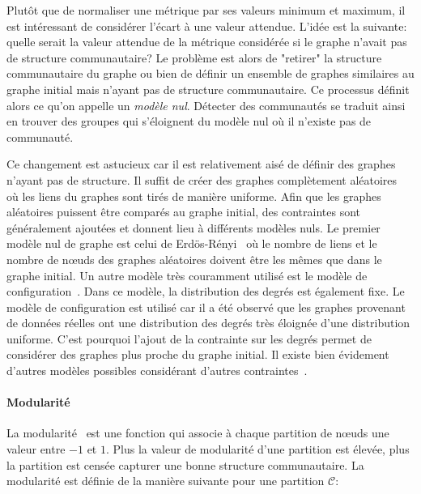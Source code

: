 \bigskip

Plutôt que de normaliser une métrique par ses valeurs minimum et maximum, il est intéressant de considérer l'écart à une valeur attendue.
L'idée est la suivante: quelle serait la valeur attendue de la métrique considérée si le graphe n'avait pas de structure communautaire?
Le problème est alors de "retirer" la structure communautaire du graphe ou bien de définir un ensemble de graphes similaires au graphe initial mais n'ayant pas de structure communautaire.
Ce processus définit alors ce qu'on appelle un \emph{modèle nul}.
Détecter des communautés se traduit ainsi en trouver des groupes qui s'éloignent du modèle nul où il n'existe pas de communauté.

Ce changement est astucieux car il est relativement aisé de définir des graphes n'ayant pas de structure.
Il suffit de créer des graphes complètement aléatoires~\cite{Erdos1959} où les liens du graphes sont tirés de manière uniforme.
Afin que les graphes aléatoires puissent être comparés au graphe initial, des contraintes sont généralement ajoutées et donnent lieu à différents modèles nuls.
Le premier modèle nul de graphe est celui de Erdös-Rényi~\cite{Erdos1959} où le nombre de liens et le nombre de n\oe{}uds des graphes aléatoires doivent être les mêmes que dans le graphe initial.
Un autre modèle très couramment utilisé est le modèle de configuration~\cite{Bender1978a}.
Dans ce modèle, la distribution des degrés est également fixe.
Le modèle de configuration est utilisé car il a été observé que les graphes provenant de données réelles ont une distribution des degrés très éloignée d'une distribution uniforme.
C'est pourquoi l'ajout de la contrainte sur les degrés permet de considérer des graphes plus proche du graphe initial. 
Il existe bien évidement d'autres modèles possibles considérant d'autres contraintes~\cite{Newman2009}.

\paragraph{Modularité}
La modularité~\cite{Newman2004} est une fonction qui associe à chaque partition de n\oe{}uds une valeur entre $-1$ et $1$.
Plus la valeur de modularité d'une partition est élevée, plus la partition est censée capturer une bonne structure communautaire.
La modularité est définie de la manière suivante pour une partition $\mathcal{C}$:


